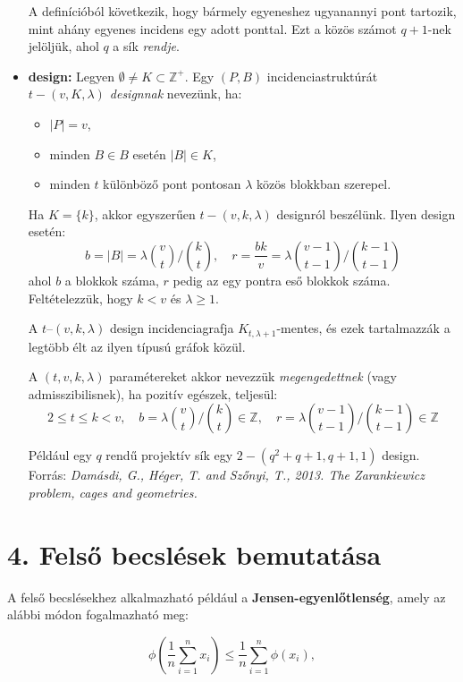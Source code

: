 \documentclass[12pt,a4paper]{article}
\begin{document}
\begin{itemize}
    A definícióból következik, hogy bármely egyeneshez ugyanannyi pont tartozik, mint ahány egyenes incidens egy adott ponttal. Ezt a közös számot $q+1$-nek jelöljük, ahol $q$ a sík \emph{rendje}.
    \item {} \textbf{design:} Legyen $\emptyset \neq K \subset \mathbb{Z}^+$. Egy $(P, B)$ incidenciastruktúrát \emph{$t-(v, K, \lambda)$ designnak} nevezünk, ha:
    \begin{itemize}[nosep]
      \item $|P| = v$,
      \item minden $B \in B$ esetén $|B| \in K$,
      \item minden $t$ különböző pont pontosan $\lambda$ közös blokkban szerepel.
    \end{itemize}
    Ha $K = \{k\}$, akkor egyszerűen $t-(v, k, \lambda)$ designról beszélünk.
    Ilyen design esetén:
    \[
    b = |B| = \lambda \binom{v}{t} \bigg/ \binom{k}{t}, \quad
    r = \frac{bk}{v} = \lambda \binom{v-1}{t-1} \bigg/ \binom{k-1}{t-1}
    \]
    ahol $b$ a blokkok száma, $r$ pedig az egy pontra eső blokkok száma. Feltételezzük, hogy $k < v$ és $\lambda \geq 1$.
    
    A $t$--$(v, k, \lambda)$ design incidenciagrafja $K_{t, \lambda+1}$-mentes, és ezek tartalmazzák a legtöbb élt az ilyen típusú gráfok közül.
    
    A $(t, v, k, \lambda)$ paramétereket akkor nevezzük \emph{megengedettnek} (vagy admisszibilisnek), ha pozitív egészek, teljesül:
    \[
    2 \leq t \leq k < v, \quad
    b = \lambda \binom{v}{t} \bigg/ \binom{k}{t} \in \mathbb{Z}, \quad
    r = \lambda \binom{v-1}{t-1} \bigg/ \binom{k-1}{t-1} \in \mathbb{Z}
    \]
    
    Például egy $q$ rendű projektív sík egy $2-(q^2 + q + 1, q + 1, 1)$ design.
    \\[5mm]
    \noindent Forrás: \textit{Damásdi, G., Héger, T. and Szőnyi, T., 2013. The Zarankiewicz problem, cages and geometries.}
\end{itemize}

\section*{4. Felső becslések bemutatása}
A felső becslésekhez alkalmazható például a \textbf{Jensen-egyenlőtlenség}, amely az alábbi módon fogalmazható meg:

\[
\phi\left( \frac{1}{n} \sum_{i=1}^{n} x_i \right) \leq \frac{1}{n} \sum_{i=1}^{n} \phi(x_i),
\]
\end{document}
